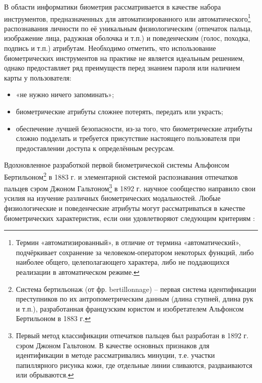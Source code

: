 \documentclass[12pt]{book}
\begin{document}
\large{В области информатики биометрия рассматривается в качестве набора инструментов, предназначенных для автоматизированного или автоматического\footnote{Термин «автоматизированный», в отличие от термина «автоматический», подчёркивает сохранение за человеком-оператором некоторых функций, либо наиболее общего, целеполагающего характера, либо не поддающихся реализации в автоматическом режиме.} распознавания личности по её уникальным физиологическим (отпечаток пальца, изображение лица, радужная оболочка и т.п.) и поведенческим (голос, походка, подпись и т.п.) атрибутам. Необходимо отметить, что использование биометрических инструментов на практике не является идеальным решением, однако предоставляет ряд преимуществ перед знанием пароля или наличием карты у пользователя: 

\begin{itemize}[topsep=1pt] \itemsep0.1em
\item «не нужно ничего запоминать»;
\item биометрические атрибуты сложнее потерять, передать или украсть;
\item обеспечение лучшей безопасности, из-за того, что биометрические атрибуты сложно подделать и требуется присутствие настоящего пользователя при предоставлении доступа к определённым ресурсам.
\end{itemize}

Вдохновленное разработкой первой биометрической системы Альфонсом Бертильоном\footnote{Система бертильонаж (от фр. bertillonnage) -- первая система идентификации преступников по их антропометрическим данным (длина ступней, длина рук и т.п.), разработанная французским юристом и изобретателем Альфонсом Бертильоном в 1883 г.} в 1883 г. и элементарной системой распознавания отпечатков пальцев сэром Джоном Гальтоном\footnote{Первый метод классификации отпечатков пальцев был разработан в 1892 г. сэром Джоном Гальтоном. В качестве основных признаков для идентификации в методе рассматривались минуции, т.е. участки папиллярного рисунка кожи, где отдельные линии сливаются, раздваиваются или обрываются.} в 1892 г. научное сообщество направило свои усилия на изучение различных биометрических модальностей. Любые физиологические и поведенческие атрибуты могут рассматриваться в качестве биометрических характеристик, если они удовлетворяют следующим критериям \cite{unar_2014}: 

}
\end{document}
